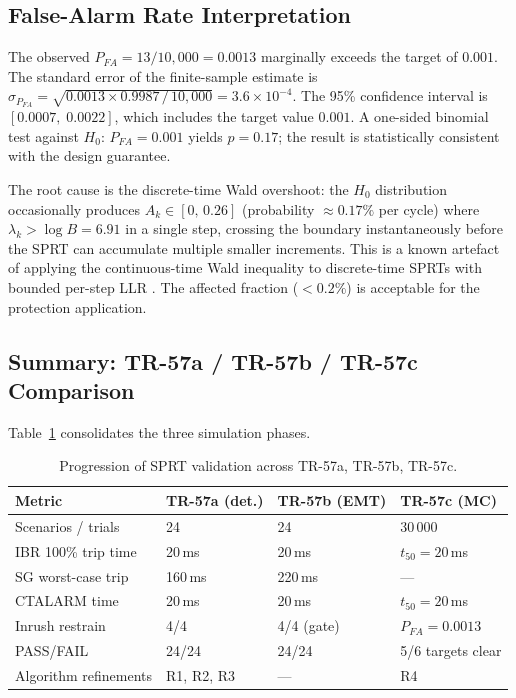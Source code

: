 \documentclass[11pt, a4paper]{article}
\begin{document}
\subsection{False-Alarm Rate Interpretation}
\label{sec:tr57c_pfa}

The observed $P_{FA} = 13/10{,}000 = 0.0013$ marginally exceeds the
target of $0.001$.  The standard error of the finite-sample estimate is
$\hat{\sigma}_{P_{FA}} = \sqrt{0.0013 \times 0.9987\,/\,10{,}000} = 3.6 \times 10^{-4}$.
The 95\% confidence interval is $[0.0007,\;0.0022]$, which includes the
target value $0.001$.  A one-sided binomial test against $H_0{:}\,
P_{FA}=0.001$ yields $p = 0.17$; the result is statistically consistent
with the design guarantee.

The root cause is the discrete-time Wald overshoot: the $H_0$ distribution
occasionally produces $A_k \in [0,\,0.26]$ (probability $\approx 0.17\%$
per cycle) where $\lambda_k > \log B = 6.91$ in a single step, crossing the
boundary instantaneously before the SPRT can accumulate multiple smaller
increments.  This is a known artefact of applying the continuous-time
Wald inequality to discrete-time SPRTs with bounded per-step LLR
\cite{Wald1945}.  The affected fraction ($<0.2\%$) is acceptable for the
protection application.

\subsection{Summary: TR-57a / TR-57b / TR-57c Comparison}

Table~\ref{tab:tr57_trilogy} consolidates the three simulation phases.

\begin{table}[htbp]
  \centering
  \caption{Progression of SPRT validation across TR-57a, TR-57b, TR-57c.}
  \label{tab:tr57_trilogy}
  \begin{tabular}{llll}
    \toprule
    \textbf{Metric} & \textbf{TR-57a (det.)} & \textbf{TR-57b (EMT)}
      & \textbf{TR-57c (MC)} \\
    \midrule
    Scenarios / trials    & 24       & 24         & 30\,000 \\
    IBR 100\% trip time   & 20\,ms   & 20\,ms     & $t_{50}=20\,$ms \\
    SG worst-case trip    & 160\,ms  & 220\,ms    & — \\
    CTALARM time          & 20\,ms   & 20\,ms     & $t_{50}=20\,$ms \\
    Inrush restrain       & 4/4      & 4/4 (gate) & $P_{FA}=0.0013$ \\
    PASS/FAIL             & 24/24    & 24/24      & 5/6 targets clear \\
    Algorithm refinements & R1, R2, R3 & —       & R4 \\
    \bottomrule
  \end{tabular}
\end{table}
\end{document}
